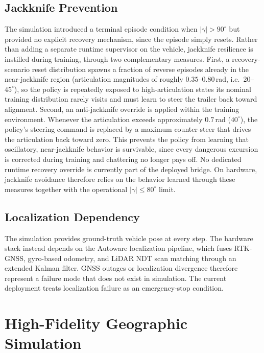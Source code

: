 \subsection{Jackknife Prevention}

The simulation introduced a terminal episode condition when $|\gamma| > 90^\circ$ but provided no explicit recovery mechanism, since the episode simply resets. Rather than adding a separate runtime supervisor on the vehicle, jackknife resilience is instilled during training, through two complementary measures. First, a recovery-scenario reset distribution spawns a fraction of reverse episodes already in the near-jackknife region (articulation magnitudes of roughly $0.35$--$0.80$\,rad, i.e.\ $20$--$45^\circ$), so the policy is repeatedly exposed to high-articulation states its nominal training distribution rarely visits and must learn to steer the trailer back toward alignment. Second, an anti-jackknife override is applied within the training environment. Whenever the articulation exceeds approximately $0.7$\,rad ($40^\circ$), the policy's steering command is replaced by a maximum counter-steer that drives the articulation back toward zero. This prevents the policy from learning that oscillatory, near-jackknife behavior is survivable, since every dangerous excursion is corrected during training and chattering no longer pays off. No dedicated runtime recovery override is currently part of the deployed bridge. On hardware, jackknife avoidance therefore relies on the behavior learned through these measures together with the operational $|\gamma| \le 80^\circ$ limit.

\subsection{Localization Dependency}

The simulation provides ground-truth vehicle pose at every step. The hardware stack instead depends on the Autoware localization pipeline, which fuses RTK-GNSS, gyro-based odometry, and LiDAR NDT scan matching through an extended Kalman filter. GNSS outages or localization divergence therefore represent a failure mode that does not exist in simulation. The current deployment treats localization failure as an emergency-stop condition.

\section{High-Fidelity Geographic Simulation}
\label{sec:geo_sim}

